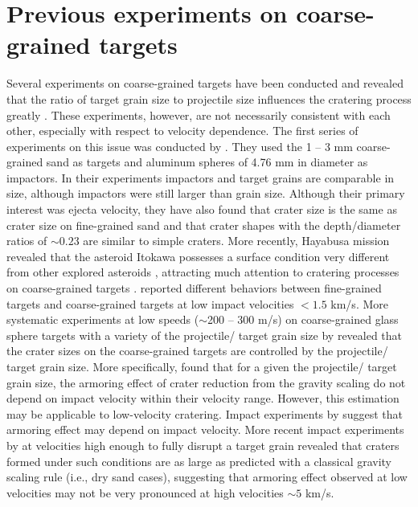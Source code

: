 \documentclass[3p,authoryear]{elsarticle}
\begin{document}
\section{Previous experiments on coarse-grained targets} \label{sec:review}
Several experiments on coarse-grained targets have been conducted and revealed that the ratio of target grain size to projectile size influences the cratering process greatly \citep{cintala1999, barnouin2005, guettler2012, holsapple2014}.
These experiments, however, are not necessarily consistent with each other, especially with respect to velocity dependence.
The first series of experiments on this issue was conducted by \citet{cintala1999}. They used the 1 -- 3 mm coarse-grained sand as targets and aluminum spheres of 4.76 mm in diameter as impactors. In their experiments impactors and target grains are comparable in size, although impactors were still larger than grain size.
Although their primary interest was ejecta velocity, they have also found that crater size is the same as crater size on fine-grained sand and that crater shapes with the depth/diameter ratios of $\sim 0.23$ are similar to simple craters.
More recently, Hayabusa mission revealed that the asteroid Itokawa possesses a surface condition very different from other explored asteroids \citep[e.g.][]{fujiwara2006,saito2006}, attracting much attention to cratering processes on coarse-grained targets \citep{barnouin2011, guettler2012, holsapple2014}.
\citet{barnouin2011} reported different behaviors between fine-grained targets and coarse-grained targets at low impact velocities $<1.5$ km/s.
More systematic experiments at low speeds ($\sim$200 -- 300 m/s) on coarse-grained glass sphere targets with a variety of the projectile/ target grain size by \citet{guettler2012} revealed that  the crater sizes on the coarse-grained targets are controlled by the projectile/ target grain size.
More specifically, \citet{guettler2012} found that for a given the projectile/ target grain size, the armoring effect of crater reduction from the gravity scaling do not depend on impact velocity within their velocity range.
However, this estimation may be applicable to low-velocity cratering. Impact experiments by \citet{barnouin2011} suggest that armoring effect may depend on impact velocity.
More recent impact experiments by \citet{holsapple2014} at velocities high enough to fully disrupt a target grain revealed that craters formed under such conditions are as large as predicted with a  classical gravity scaling rule (i.e., dry sand cases), suggesting that armoring effect observed at low velocities may not be very pronounced at high velocities $\sim 5$ km/s.
\end{document}
